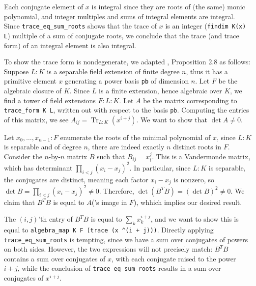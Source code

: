 \documentclass[a4paper,USenglish,cleveref, autoref, thm-restate]{lipics-v2021}
\newcommand{\lean}[1]{\texttt{#1}\xspace} %
\DeclareMathOperator{\Tr}{\mathrm{Tr}}
\newcommand{\pow}{\textasciicircum\xspace}
\begin{document}
Each conjugate element of $x$ is integral since they are roots of (the same) monic polynomial,
and integer multiples and sums of integral elements are integral.
Since \lean{trace\_eq\_sum\_roots} shows that the trace of $x$ is an integer (\lean{findim K(x) L}) multiple of a sum of conjugate roots,
we conclude that the trace (and trace form) of an integral element is also integral.

To show the trace form is nondegenerate, we adapted \cite{Neukirch}, Proposition 2.8 as follows:
Suppose $L : K$ is a separable field extension of finite degree $n$,
thus it has a primitive element $x$ generating a power basis \lean{pb} of dimension $n$.
Let $F$ be the algebraic closure of $K$. Since $L$ is a finite extension, hence algebraic over $K$, we find a tower of field extensions $F : L : K$.
Let $A$ be the matrix corresponding to \lean{trace\_form K L}, written out with respect to the basis \lean{pb}.
Computing the entries of this matrix, we see $A_{ij} = \Tr_{L : K} (x^{i + j})$.
We want to show that $\det A \ne 0$.

Let $x_0, \dots, x_{n - 1} : F$ enumerate the roots of the minimal polynomial of $x$,
since $L : K$ is separable and of degree $n$, there are indeed exactly $n$ distinct roots in $F$.
Consider the $n$-by-$n$ matrix $B$ such that $B_{ij} = x_i^j$.
This is a Vandermonde matrix, which has determinant $\prod_{i < j} (x_i - x_j)^2$.
In particular, since $L : K$ is separable, the conjugates are distinct, meaning each factor $x_i - x_j$ is nonzero,
so $\det B = \prod_{i < j} (x_i - x_j)^2 \ne 0$.
Therefore, $\det (B^T B) = (\det B)^2 \ne 0$.
We claim that $B^T B$ is equal to $A$('s image in $F$), whhich implies our desired result.

The $(i, j)$'th entry of $B^T B$ is equal to $\sum_k x_k^{i + j}$,
and we want to show this is equal to \lean{algebra\_map K F (trace (x \pow (i + j)))}.
Directly applying \lean{trace\_eq\_sum\_roots} is tempting, since we have a sum over conjugates of powers on both sides.
However, the two expressions will not precisely match: $B^T B$ contains a sum over conjugates of $x$, with each conjugate raised to the power $i + j$,
while the conclusion of \lean{trace\_eq\_sum\_roots} results in a sum over conjugates of $x^{i + j}$.
\end{document}
